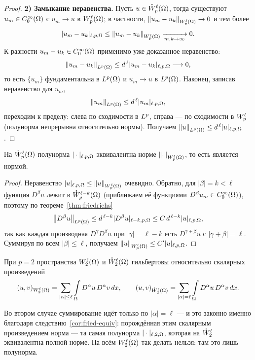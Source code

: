 \begin{proof}
\textbf{2) Замыкание неравенства.} Пусть $u \in \mathring{W}_{p}^{\ell}(\Omega)$, тогда существуют
$u_m \in C_0^\infty(\Omega)$ с $u_m \to u$ в $W_{p}^{\ell}(\Omega)$; в частности,
$\left\lVert u_m - u_k \right\rVert_{W_{p}^{\ell}(\Omega)} \to 0$ и тем более
\[
  |u_m - u_k|_{\ell,p,\Omega} \le \left\lVert u_m - u_k \right\rVert_{W_{p}^{\ell}(\Omega)} \xrightarrow[m,k \to \infty]{} 0 .
\]
К разности $u_m - u_k \in C_0^\infty(\Omega)$ применимо уже доказанное неравенство:
\[
  \left\lVert u_m - u_k \right\rVert_{L^{p}(\Omega)} \le d^{\,\ell} |u_m - u_k|_{\ell,p,\Omega} \longrightarrow 0 ,
\]
то есть $\{u_m\}$ фундаментальна в $L^{p}(\Omega)$ и $u_m \to u$ в $L^{p}(\Omega)$. Наконец,
записав неравенство для $u_m$,
\[
  \left\lVert u_m \right\rVert_{L^{p}(\Omega)} \le d^{\,\ell} |u_m|_{\ell,p,\Omega} ,
\]
переходим к пределу: слева по сходимости в $L^{p}$, справа — по сходимости в
$W_{p}^{\ell}$ (полунорма непрерывна относительно нормы). Получаем
$\left\lVert u \right\rVert_{L^{p}(\Omega)} \le d^{\,\ell}|u|_{\ell,p,\Omega}$.
\end{proof}

\begin{corollary}\label{cor:fried-equiv}
На $\mathring{W}_{p}^{\ell}(\Omega)$ полунорма $|\cdot|_{\ell,p,\Omega}$ эквивалентна норме
$\left\lVert \cdot \right\rVert_{W_{p}^{\ell}(\Omega)}$, то есть является нормой.
\end{corollary}

\begin{proof}
Неравенство $|u|_{\ell,p,\Omega} \le \left\lVert u \right\rVert_{W_{p}^{\ell}(\Omega)}$ очевидно. Обратно, для
$|\beta| = k < \ell$ функция $D^\beta u$ лежит в $\mathring{W}_{p}^{\ell-k}(\Omega)$ (приближаем её
функциями $D^\beta u_m \in C_0^\infty(\Omega)$), поэтому по теореме~\ref{thm:friedrichs}
\[
  \left\lVert D^\beta u \right\rVert_{L^{p}(\Omega)} \le d^{\,\ell-k} |D^\beta u|_{\ell-k,p,\Omega}
  \le C\, d^{\,\ell-k} |u|_{\ell,p,\Omega} ,
\]
так как каждая производная $D^\gamma D^\beta u$ при $|\gamma| = \ell - k$ есть
$D^{\gamma+\beta} u$ с $|\gamma + \beta| = \ell$. Суммируя по всем $|\beta| \le \ell$,
получаем $\left\lVert u \right\rVert_{W_{p}^{\ell}(\Omega)} \le C' |u|_{\ell,p,\Omega}$.
\end{proof}

\begin{remark}
При $p = 2$ пространства $W_{2}^{\ell}(\Omega)$ и $\mathring{W}_{2}^{\ell}(\Omega)$ гильбертовы
относительно скалярных произведений
\[
  (u,v)_{W_{2}^{\ell}(\Omega)} = \sum_{|\alpha| \le \ell} \int\limits_\Omega D^\alpha u\, D^\alpha v\, dx ,
  \qquad
  (u,v)_{\mathring{W}_{2}^{\ell}(\Omega)} = \sum_{|\alpha| = \ell} \int\limits_\Omega D^\alpha u\, D^\alpha v\, dx .
\]
\end{remark}

\begin{idea}
Во втором случае суммирование идёт только по $|\alpha| = \ell$ — и это законно именно
благодаря следствию~\ref{cor:fried-equiv}: порождённая этим скалярным произведением
норма — та самая полунорма $|\cdot|_{\ell,2,\Omega}$, которая на $\mathring{W}_{2}^{\ell}$ эквивалентна
полной норме. На всём $W_{2}^{\ell}(\Omega)$ так делать нельзя: там это лишь полунорма.
\end{idea}
